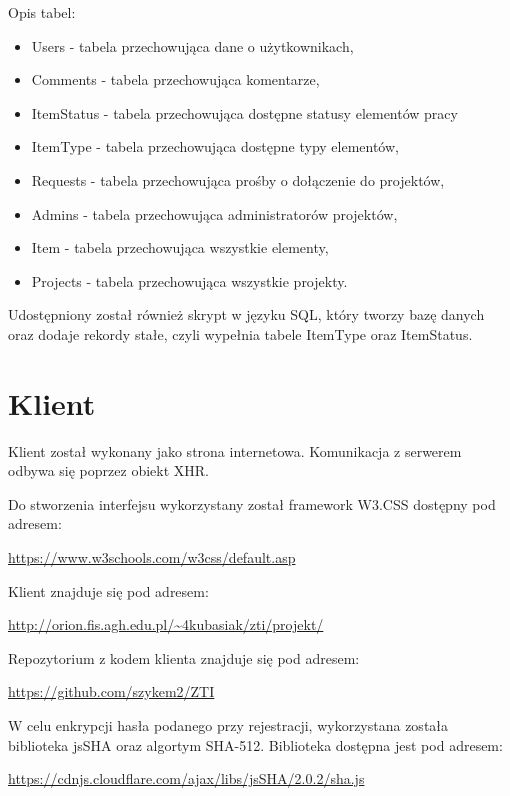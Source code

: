 \documentclass[11pt, titlepage]{article}
\begin{document}
Opis tabel:
\begin{itemize}
\item Users - tabela przechowująca dane o użytkownikach,
\item Comments - tabela przechowująca komentarze,
\item ItemStatus - tabela przechowująca dostępne statusy elementów pracy
\item ItemType - tabela przechowująca dostępne typy elementów,
\item Requests - tabela przechowująca prośby o dołączenie do projektów,
\item Admins - tabela przechowująca administratorów projektów,
\item Item - tabela przechowująca wszystkie elementy,
\item Projects - tabela przechowująca wszystkie projekty.
\end{itemize}

Udostępniony został również skrypt w języku SQL, który tworzy bazę danych oraz dodaje rekordy stałe, czyli wypełnia tabele ItemType oraz ItemStatus.

\section{Klient}
\hspace{11pt} Klient został wykonany jako strona internetowa. Komunikacja z serwerem odbywa się poprzez obiekt XHR.

Do stworzenia interfejsu wykorzystany został framework W3.CSS dostępny pod adresem:
\begin{center}
\url{https://www.w3schools.com/w3css/default.asp}
\end{center}

Klient znajduje się pod adresem:
\begin{center}
\url{http://orion.fis.agh.edu.pl/~4kubasiak/zti/projekt/}
\end{center}

Repozytorium z kodem klienta znajduje się pod adresem:
\begin{center}
\url{https://github.com/szykem2/ZTI}
\end{center}

W celu enkrypcji hasła podanego przy rejestracji, wykorzystana została biblioteka jsSHA oraz algortym SHA-512. Biblioteka dostępna jest pod adresem:

\begin{center}
\url{https://cdnjs.cloudflare.com/ajax/libs/jsSHA/2.0.2/sha.js}
\end{center}
\end{document}
